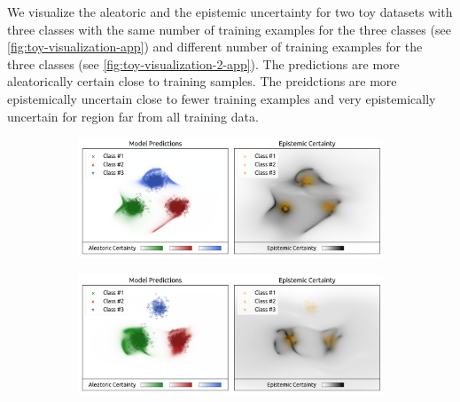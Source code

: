 We visualize the aleatoric and the epistemic uncertainty for two toy datasets with three classes with the same number of training examples for the three classes (see \cref{fig:toy-visualization-app}) and different number of training examples for the three classes (see \cref{fig:toy-visualization-2-app}). The predictions are more aleatorically certain close to training samples. The preidctions are more epistemically uncertain close to fewer training examples and very epistemically uncertain for region far from all training data.

\begin{figure}[ht!]
    \centering
    \caption{Visualization of the aleatoric and epistemic uncertainty on a 2D toy dataset with 3 classes with $900$ training samples for each class.}
    \label{fig:toy-visualization-app}
    \begin{subfigure}[t]{.75\textwidth}
        \centering
        \includegraphics[width=1\textwidth]{sections/007_iclr2022/resources/appendix/toy-900-900-900.png}
    \end{subfigure}%
\end{figure}

\begin{figure}[ht!]
    \centering
    \caption{Visualization of the aleatoric and epistemic uncertainty on a 2D toy dataset with 3 classes with $900$ training samples for class 1 (green), $600$ training samples for class 2 (red) and $300$ training samples for class 2 (blue).}
    \label{fig:toy-visualization-2-app}
    \begin{subfigure}[t]{.75\textwidth}
        \centering
        \includegraphics[width=1\textwidth]{sections/007_iclr2022/resources/appendix/toy-900-600-300.png}
    \end{subfigure}%
\end{figure}

